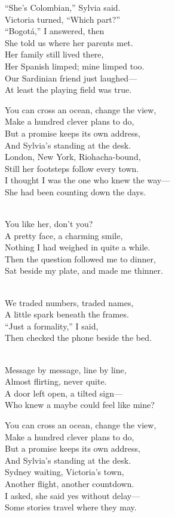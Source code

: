 \begin{lyrics}
“She’s Colombian,” Sylvia said.\\
Victoria turned, “Which part?”\\
“Bogotá,” I answered, then\\
She told us where her parents met.\\
Her family still lived there,\\
Her Spanish limped; mine limped too.\\
Our Sardinian friend just laughed—\\
At least the playing field was true.

You can cross an ocean, change the view,\\
Make a hundred clever plans to do,\\
But a promise keeps its own address,\\
And Sylvia’s standing at the desk.\\
London, New York, Riohacha-bound,\\
Still her footsteps follow every town.\\
I thought I was the one who knew the way—\\
She had been counting down the days.

\\
You like her, don’t you?
\\
A pretty face, a charming smile,\\
Nothing I had weighed in quite a while.\\
Then the question followed me to dinner,\\
Sat beside my plate, and made me thinner.

\\
We traded numbers, traded names,\\
A little spark beneath the frames.
\\
“Just a formality,” I said,\\
Then checked the phone beside the bed.

\\
Message by message, line by line,\\
Almost flirting, never quite.\\
A door left open, a tilted sign—\\
Who knew a maybe could feel like mine?

You can cross an ocean, change the view,\\
Make a hundred clever plans to do,\\
But a promise keeps its own address,\\
And Sylvia’s standing at the desk.\\
Sydney waiting, Victoria’s town,\\
Another flight, another countdown.\\
I asked, she said yes without delay—\\
Some stories travel where they may.


\end{lyrics}

